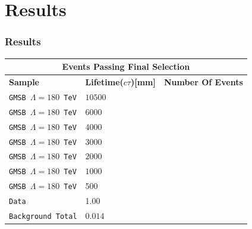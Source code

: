 \documentclass{beamer}
\begin{document}
\section{Results}
\begin{frame}
\frametitle{Results}
\begin{minipage}[t]{0.8\textwidth}
\centering
\begin{tabular}{l l l}
\multicolumn{3}{c}{\bfseries{Events Passing Final Selection}} \\
  \hline
   \bfseries{Sample} &\bfseries{Lifetime($c\tau$)[mm]} &\bfseries{Number Of Events} \\
   \hline
   \texttt{GMSB $\Lambda=180$ TeV}& $10500$ & \\
   \texttt{GMSB $\Lambda=180$ TeV}& $ 6000$ &  \\
   \texttt{GMSB $\Lambda=180$ TeV}& $ 4000$&  \\
   \texttt{GMSB $\Lambda=180$ TeV}& $ 3000 $&   \\
   \texttt{GMSB $\Lambda=180$ TeV}& $ 2000$&   \\
   \texttt{GMSB $\Lambda=180$ TeV}& $ 1000$&  \\
   \texttt{GMSB $\Lambda=180$ TeV}& $ 500$&  \\
   \hline
   \texttt{Data} & 1.00 &    \\
   \texttt{Background Total} & $0.014$ & \\
  \hline \hline
 \end{tabular} 
 \end{minipage}

\end{frame}
\end{document}
